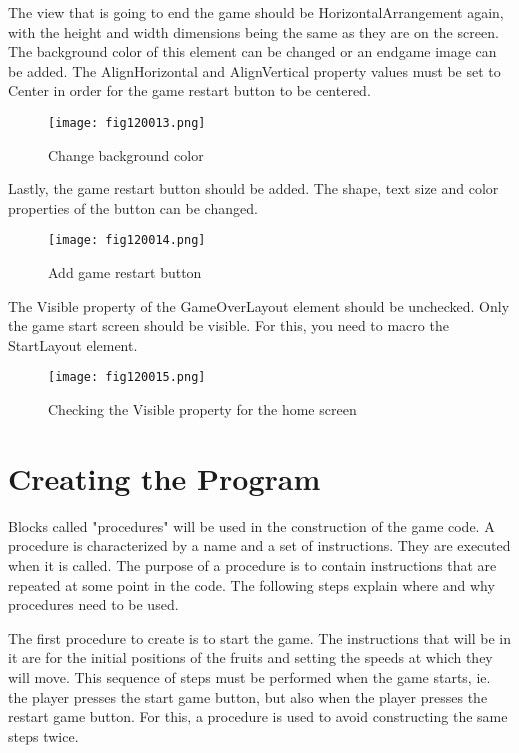 The view that is going to end the game should be HorizontalArrangement again, with the height and width dimensions being the same as they are on the screen. The background color of this element can be changed or an endgame image can be added. The AlignHorizontal and AlignVertical property values must be set to Center in order for the game restart button to be centered.

\begin{figure}[H]
   \centering
   \texttt{[image: fig120013.png]}
   \caption{Change background color}
\label{fig120013}
\end{figure}

Lastly, the game restart button should be added. The shape, text size and color properties of the button can be changed.

\begin{figure}[H]
   \centering
   \texttt{[image: fig120014.png]}
   \caption{Add game restart button}
\label{fig120014}
\end{figure}

The Visible property of the GameOverLayout element should be unchecked. Only the game start screen should be visible. For this, you need to macro the StartLayout element.

\begin{figure}[H]
   \centering
   \texttt{[image: fig120015.png]}
   \caption{Checking the Visible property for the home screen}
\label{fig120015}
\end{figure}

\section{Creating the Program}
Blocks called "procedures" will be used in the construction of the game code. A procedure is characterized by a name and a set of instructions. They are executed when it is called. The purpose of a procedure is to contain instructions that are repeated at some point in the code. The following steps explain where and why procedures need to be used.

The first procedure to create is to start the game. The instructions that will be in it are for the initial positions of the fruits and setting the speeds at which they will move. This sequence of steps must be performed when the game starts, ie. the player presses the start game button, but also when the player presses the restart game button. For this, a procedure is used to avoid constructing the same steps twice.

